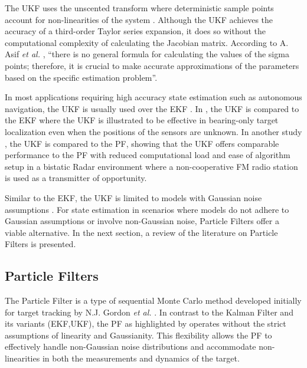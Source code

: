 The \ac{UKF} uses the unscented transform where deterministic sample points account for non-linearities of the system \cite{Yin2021}. Although the \ac{UKF} achieves the accuracy of a third-order Taylor series expansion, it does so without the computational complexity of calculating the Jacobian matrix. According to A. Asif  \textit{et al.} \cite{Measurements2023b}, \textquotedblleft there is no general formula for calculating the values of the sigma points; therefore, it is crucial to make accurate approximations of the parameters based on the specific estimation problem\textquotedblright.

In most applications requiring high accuracy state estimation such as autonomous navigation, the \ac{UKF} is usually used over the \ac{EKF} \cite{Costanzi2017,Grewal2006,Costanzi2019}. In \cite{Costanzi2017}, the \ac{UKF} is compared to the \ac{EKF} where the \ac{UKF} is illustrated to be effective in bearing-only target localization even when the positions of the sensors are unknown. In another study \cite{Ortenzi2009}, the \ac{UKF} is compared to the \ac{PF}, showing that the \ac{UKF} offers comparable performance to the \ac{PF} with reduced computational load and ease of algorithm setup in a bistatic \ac{Radar} environment where a non-cooperative \ac{FM} radio station is used as a transmitter of opportunity.

Similar to the \ac{EKF}, the \ac{UKF} is limited to models with Gaussian noise assumptions \cite{Konatowski2017}. For state estimation in scenarios where models do not adhere to Gaussian assumptions or involve non-Gaussian noise, Particle Filters offer a viable alternative. In the next section, a review of the literature on Particle Filters is presented.
%
\subsection{Particle Filters}
The Particle Filter is a type of sequential Monte Carlo method developed initially for target tracking by N.J. Gordon \textit{et al.}  \cite{NJGordon}. In contrast to the Kalman Filter and its variants (\ac{EKF},\ac{UKF}), the \ac{PF} as highlighted by \cite{MFeroz} operates without the strict assumptions of linearity and Gaussianity. This flexibility allows the \ac{PF} to effectively handle non-Gaussian noise distributions and accommodate non-linearities in both the measurements and dynamics of the target.

